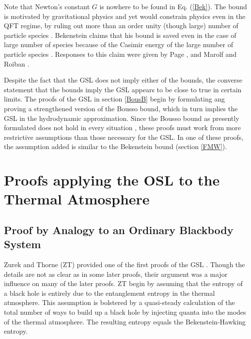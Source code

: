 \documentclass{article}
\begin{document}
Note that Newton's constant $G$ is nowhere to be found in Eq. (\ref{Bek}).  The bound is motivated by gravitational physics and yet would constrain physics even in the QFT regime, by ruling out more than an order unity (though large) number of particle species \cite{page82}.  Bekenstein claims that his bound is saved even in the case of large number of species because of the Casimir energy of the large number of particle species \cite{bek94b}.  Responses to this claim were given by Page \cite{page04}, and Marolf and Roiban \cite{MR04}.

Despite the fact that the GSL does not imply either of the bounds, the converse statement that the bounds imply the GSL appears to be close to true in certain limits.  The proofs of the GSL in section \ref{BousB} begin by formulating ang proving a strengthened version of the Bousso bound, which in turn implies the GSL in the hydrodynamic approximation.  Since the Bousso bound as presently formulated does not hold in every situation \cite{lowe99}, these proofs must work from more restrictive assumptions than those necessary for the GSL.  In one of these proofs, the assumption added is similar to the Bekenstein bound (section \ref{FMW}).

\section{Proofs applying the OSL to the Thermal Atmosphere}\label{osl}

\subsection{Proof by Analogy to an Ordinary Blackbody System}\label{heur}

Zurek and Thorne (ZT) provided one of the first proofs of the GSL \cite{ZT85}.  Though the details are not as clear as in some later proofs, their argument was a major influence on many of the later proofs.  ZT begin by assuming that the entropy of a black hole is entirely due to the entanglement entropy in the thermal atmosphere.  This assumption is bolstered by a quasi-steady calculation of the total number of ways to build up a black hole by injecting quanta into the modes of the thermal atmosphere.  The resulting entropy equals the Bekenstein-Hawking entropy.
\end{document}
